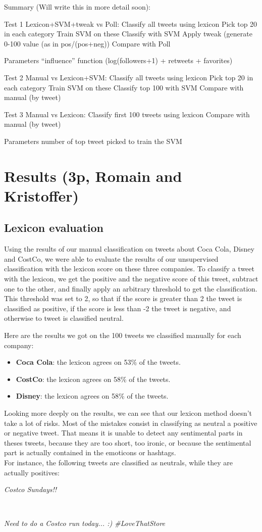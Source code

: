 \documentclass[a4paper,12pt]{report}
\begin{document}
Summary (Will write this in more detail soon):

Test 1 Lexicon+SVM+tweak vs Poll:
Classify all tweets using lexicon
Pick top 20 in each category
Train SVM on these
Classify with SVM
Apply tweak (generate 0-100 value (as in pos/(pos+neg))
Compare with Poll

Parameters
“influence” function (log(followers+1) + retweets + favorites)


Test 2 Manual vs Lexicon+SVM:
Classify all tweets using lexicon
Pick top 20 in each category
Train SVM on these
Classify top 100 with SVM
Compare with manual (by tweet)


Test 3 Manual vs Lexicon:
Classify first 100 tweets using lexicon
Compare with manual (by tweet)

Parameters
number of top tweet picked to train the SVM



\chapter{Results (3p, Romain and Kristoffer)}

\section{Lexicon evaluation}

Using the results of our manual classification on tweets about Coca Cola, Disney and CostCo, we were able to evaluate the results of our unsupervised classification with the lexicon score on these three companies.
To classify a tweet with the lexicon, we get the positive and the negative score of this tweet, subtract one to the other, and finally apply an arbitrary threshold to get the classification.
This threshold was set to 2, so that if the score is greater than 2 the tweet is classified as positive, if the score is less than -2 the tweet is negative, and otherwise to tweet is classified neutral.

Here are the results we got on the 100 tweets we classified manually for each company:
\begin{itemize}
        \item \textbf{Coca Cola}: the lexicon agrees on 53\% of the tweets.
        \item \textbf{CostCo}: the lexicon agrees on 58\% of the tweets.
        \item \textbf{Disney}: the lexicon agrees on 58\% of the tweets.
\end{itemize}
Looking more deeply on the results, we can see that our lexicon method doesn't take a lot of risks.
Most of the mistakes consist in classifying as neutral a positive or negative tweet. That means it is unable to detect any sentimental parts in theses tweets, because they are too short, too ironic, or because the sentimental part is actually contained in the emoticons or hashtags.\\
For instance, the following tweets are classified as neutrals, while they are actually positives:\\
\centerline{\textit{Costco Sundays!!}}\\
\centerline{\textit{Need to do a Costco run today... :) \#LoveThatStore}}
\end{document}
